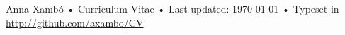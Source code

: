 \documentclass[10pt, a4paper]{article}
\begin{document}
\vfill{}

\begin{center}
{\scriptsize  Anna Xambó •\- Curriculum Vitae •\- Last updated: \today\- •\- %
Typeset in \href{http://nitens.org/taraborelli/cvtex}{
\XeTeX }\\
\href{http://github.com/axambo/CV}{http://github.com/axambo/CV}}
\end{center}
\end{document}
